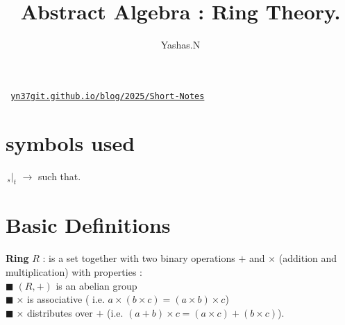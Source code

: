 \documentclass[11pt]{extarticle}
\author{Yashas.N}
\title{Abstract Algebra : Ring Theory.}
\date{}
\newcommand{\ra}{\rightarrow}
\newcommand{\tm}{\times}
\newcommand{\snote}[1]{{\footnotesize(#1)}}
\newcommand{\st}{\,{}_{s}|_t\,}
\newcommand{\tbx}[2][]{
	\begin{tcolorbox}[enhanced,breakable,size=small,colback=black!2!white,title={#1},arc is angular, arc=1.5mm,drop fuzzy shadow]
		#2
	\end{tcolorbox}
}
\newcommand{\y}{$\blacksquare\;$}
\begin{document}
	\maketitle
\begin{center}\texttt{
		\href{https://yn37git.github.io/blog/2025/Short-Notes/}{yn37git.github.io/blog/2025/Short-Notes}}
\end{center} 

	\begin{multicols}{2}
		\tableofcontents

\section*{symbols used}
		\begin{center}
			$ \st \, \ra  $ such that.\\
			
		\end{center}
		\section{Basic Definitions}
			\tbx{ \textbf{Ring } $R$ : is a set together with two binary operations $ + $ and $ \tm $ \snote{addition  and multiplication} with properties :\\
			\y $ (R,+) $ is an abelian group \\
			\y $ \tm $ is associative \snote{ i.e. $ a\tm (b \tm c)=(a\tm b)\tm c  $} \\
			\y $ \tm $ distributes over $ + $ \snote{i.e. $(a+b)\tm c= (a\tm c)+(b\tm c)$}.} 


\end{multicols}
\end{document}

